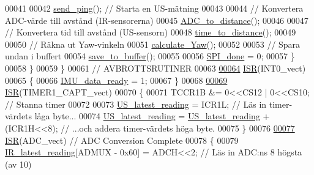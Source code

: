 \begin{DoxyCode}
00041 
00042             \hyperlink{sensor_8c_ae0b3db1a7cd93a0205ff39ef05844259}{send\_ping}();                   \textcolor{comment}{// Starta en US-mätning}
00043             
00044             \textcolor{comment}{// Konvertera ADC-värde till avstånd (IR-sensorerna)}
00045             \hyperlink{sensor_8c_ad15899f7d08c246d74789f75dd145035}{ADC\_to\_distance}();
00046 
00047             \textcolor{comment}{// Konvertera tid till avstånd (US-sensorn)}
00048             \hyperlink{sensor_8c_a4400365e5a5de20eeaf4e78531e39e9b}{time\_to\_distance}();
00049             
00050             \textcolor{comment}{// Räkna ut Yaw-vinkeln }
00051             \hyperlink{sensor_8c_a5611f3fef1c7ebe6f76d952adf576e86}{calculate\_Yaw}();   
00052             
00053             \textcolor{comment}{// Spara undan i buffert            }
00054             \hyperlink{sensor_8c_a387deb5b003e6eec445d95d9b30717f4}{save\_to\_buffer}();             
00055 
00056             \hyperlink{sensor_8h_a320a1ee237ba550bcdffd131a4198e17}{SPI\_done} = 0;
00057         \}
00058     \}
00059 \}
00061 \textcolor{comment}{//                                  AVBROTTSRUTINER}
00063 \textcolor{comment}{}
\hypertarget{sensor_8c_source.tex_l00064}{}\hyperlink{sensor_8c_afea150fcd685610cb9f7672fce361e53}{00064} \hyperlink{sensor_8c_afea150fcd685610cb9f7672fce361e53}{ISR}(INT0\_vect)
00065 \{
00066     \hyperlink{sensor_8h_aada9974f9914a0bef6efe028d48ae383}{IMU\_data\_ready} = 1;
00067 \}
00068 
\hypertarget{sensor_8c_source.tex_l00069}{}\hyperlink{sensor_8c_a5da59e05fa5ade4be7c7656aee78291a}{00069} \hyperlink{sensor_8c_afea150fcd685610cb9f7672fce361e53}{ISR}(TIMER1\_CAPT\_vect)
00070 \{
00071     TCCR1B &= 0<<CS12 | 0<<CS10;            \textcolor{comment}{// Stanna timer}
00072 
00073     \hyperlink{sensor_8h_a6619824120bb407a94821a66f8bb922f}{US\_latest\_reading} = ICR1L;                     \textcolor{comment}{// Läs in timer-värdets låga byte...}
00074     \hyperlink{sensor_8h_a6619824120bb407a94821a66f8bb922f}{US\_latest\_reading} = \hyperlink{sensor_8h_a6619824120bb407a94821a66f8bb922f}{US\_latest\_reading} + (ICR1H<<8);   \textcolor{comment}{// ...och
       addera timer-värdets höga byte.}
00075 \}
00076 
\hypertarget{sensor_8c_source.tex_l00077}{}\hyperlink{sensor_8c_a05c2e5b588ced1cd7312f5b0edc5b295}{00077} \hyperlink{sensor_8c_afea150fcd685610cb9f7672fce361e53}{ISR}(ADC\_vect)        \textcolor{comment}{// ADC Conversion Complete}
00078 \{
00079     \hyperlink{sensor_8h_a59d49b9b5c4c473c2c5cb4fcabb2bb36}{IR\_latest\_reading}[ADMUX - 0x60] = ADCH<<2;     \textcolor{comment}{// Läs in ADC:ns 8 högsta (av 10)
}
\end{DoxyCode}
